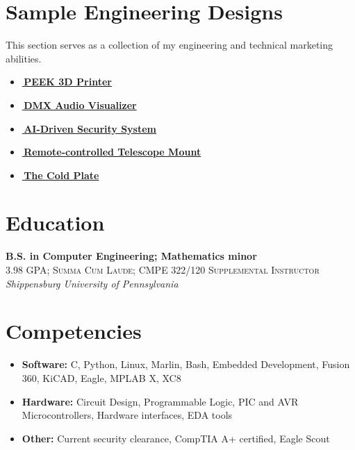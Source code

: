 \documentclass[
	12pt, %
]{FreemanCV}
\begin{document}
\section{Sample Engineering Designs}
{
	This section serves as a collection of my engineering and technical marketing abilities.
	\vspace*{-7pt}
	\begin{itemize}[leftmargin=10pt]
		\itemsep-5pt
		\item \href{https://github.com/jfcbooth/3dpp}{\linkcolor\scriptsize\faLink\normalcolor\normalsize\,\textbf{PEEK 3D Printer}}
		\item \href{https://github.com/microchip-pic-avr-examples/pic16f56q71-audio-light-show-mplab-mcc}{\linkcolor\scriptsize\faLink\normalcolor\normalsize\,\textbf{DMX Audio Visualizer}}
		\item \href{https://github.com/jfcbooth/security_system}{\linkcolor\scriptsize\faLink\normalcolor\normalsize\,\textbf{AI-Driven Security System}}
		\item \href{https://github.com/jfcbooth/hadley_electric_stand}{\linkcolor\scriptsize\faLink\normalcolor\normalsize\,\textbf{Remote-controlled Telescope Mount}}
		\item \href{https://github.com/microchip-pic-avr-examples/pic16f17146-cold-plate-mplab-mcc}{\linkcolor\scriptsize\faLink\normalcolor\normalsize\,\textbf{The Cold Plate}}
	\end{itemize}
}

\section{Education}
	\textbf{B.S. in Computer Engineering; Mathematics minor}\\ %
	\small\textsc{3.98 GPA; Summa Cum Laude; CMPE 322/120 Supplemental Instructor}\\ %
	\textit{Shippensburg University of Pennsylvania}\\ %

\vspace*{-10pt}
\section{Competencies}
\begin{itemize}[leftmargin=10pt]
	\itemsep-5pt
	\item \textbf{Software:} C, Python, Linux, Marlin, Bash, Embedded Development, Fusion 360, KiCAD, Eagle, MPLAB X, XC8
	\item \textbf{Hardware:} Circuit Design, Programmable Logic, PIC and AVR Microcontrollers, Hardware interfaces, EDA tools
	\item \textbf{Other:} Current security clearance, CompTIA A+ certified, Eagle Scout
\end{itemize}

\vfill
\vspace{1cm}
\end{document}
